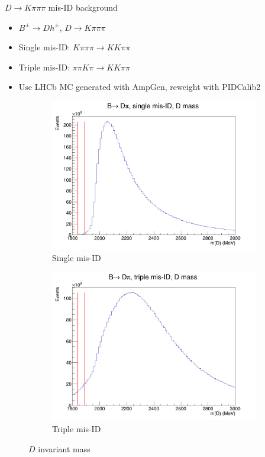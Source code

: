 \documentclass{beamer}
\begin{document}
\begin{frame}{$D\to K\pi\pi\pi$ mis-ID background}
  \begin{itemize}
    \setlength\itemsep{0.5em}
    \item{$B^\pm\to Dh^\pm$, $D\to K\pi\pi\pi$}
    \item{Single mis-ID: $K\pi\pi\pi\to KK\pi\pi$}
    \item{Triple mis-ID: $\pi\pi K\pi\to KK\pi\pi$}
    \item{Use LHCb MC generated with AmpGen, reweight with PIDCalib2}
  \end{itemize}
  \begin{figure}
    \centering
    \begin{subfigure}{0.45\textwidth}
      \includegraphics[width = 1.0\textwidth]{Plots/Kpipipi_SingleMisID_Dpi_DMass.png}
      \caption{Single mis-ID}
    \end{subfigure}%
    \begin{subfigure}{0.45\textwidth}
      \includegraphics[width = 1.0\textwidth]{Plots/Kpipipi_TripleMisID_Dpi_DMass.png}
      \caption{Triple mis-ID}
    \end{subfigure}
    \caption{$D$ invariant mass}
  \end{figure}
\end{frame}
\end{document}
